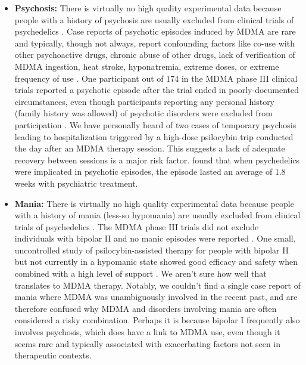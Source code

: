 \documentclass[12pt,letterpaper]{book}
\begin{document}
\begin{itemize}
\begin{itemize}
            \item \textbf{Psychosis:} There is virtually no high quality experimental data because people with a history of psychosis are usually excluded from clinical trials of psychedelics \cite{la2022Psychosis}. Case reports of psychotic episodes induced by MDMA are rare and typically, though not always, report confounding factors like co-use with other psychoactive drugs, chronic abuse of other drugs, lack of verification of MDMA ingestion, heat stroke, hyponatremia, extreme doses, or extreme frequency of use \cite{psychosisTreatment,arnovitzSchizophrenia,mcguirePsychosis,patelPsychosis,vaivaPsychosis}. One participant out of 174 in the MDMA phase III clinical trials reported a psychotic episode after the trial ended in poorly-documented circumstances, even though participants reporting any personal history (family history was allowed) of psychotic disorders were excluded from participation \cite{powerTrip,smithSystematic,mitchellMDMAClinicalTrial2}. We have personally heard of two cases of temporary psychosis leading to hospitalization triggered by a high-dose psilocybin trip conducted the day after an MDMA therapy session. This suggests a lack of adequate recovery between sessions is a major risk factor. \textcite{psychosisTreatment} found that when psychedelics were implicated in psychotic episodes, the episode lasted an average of 1.8 weeks with psychiatric treatment.
            \item \textbf{Mania:} There is virtually no high quality experimental data because people with a history of mania (less-so hypomania) are usually excluded from clinical trials of psychedelics \cite{gardBipolar}. The MDMA phase III trials did not exclude individuals with bipolar II and no manic episodes were reported \cite{mitchellMDMAClinicalTrial2}. One small, uncontrolled study of psilocybin-assisted therapy for people with bipolar II but not currently in a hypomanic state showed good efficacy and safety when combined with a high level of support \cite{aaronsonBipolarII}. We aren't sure how well that translates to MDMA therapy. Notably, we couldn't find a single case report of mania where MDMA was unambiguously involved in the recent past, and are therefore confused why MDMA and disorders involving mania are often considered a risky combination. Perhaps it is because bipolar I frequently also involves psychosis, which does have a link to MDMA use, even though it seems rare and typically associated with exacerbating factors not seen in therapeutic contexts.
        \end{itemize}

\end{itemize}
\end{document}
